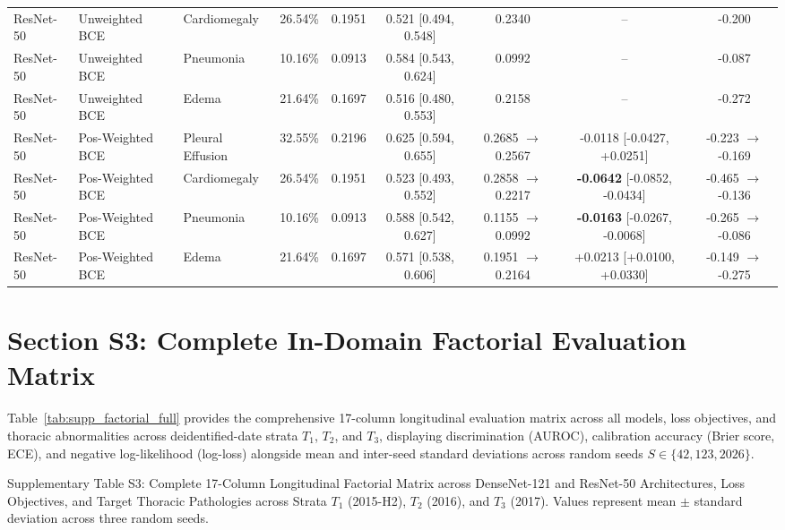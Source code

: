 \documentclass[preprint,12pt]{elsarticle}
\begin{document}
\begin{table}[!htbp]
{\begin{tabular}{lllcccccc}
ResNet-50 & Unweighted BCE & Cardiomegaly & 26.54\% & 0.1951 & 0.521 [0.494, 0.548] & 0.2340 & -- & -0.200 \\
ResNet-50 & Unweighted BCE & Pneumonia & 10.16\% & 0.0913 & 0.584 [0.543, 0.624] & 0.0992 & -- & -0.087 \\
ResNet-50 & Unweighted BCE & Edema & 21.64\% & 0.1697 & 0.516 [0.480, 0.553] & 0.2158 & -- & -0.272 \\
\midrule
ResNet-50 & Pos-Weighted BCE & Pleural Effusion & 32.55\% & 0.2196 & 0.625 [0.594, 0.655] & 0.2685 $\to$ 0.2567 & -0.0118 [-0.0427, +0.0251] & -0.223 $\to$ -0.169 \\
ResNet-50 & Pos-Weighted BCE & Cardiomegaly & 26.54\% & 0.1951 & 0.523 [0.493, 0.552] & 0.2858 $\to$ 0.2217 & \textbf{-0.0642} [-0.0852, -0.0434] & -0.465 $\to$ -0.136 \\
ResNet-50 & Pos-Weighted BCE & Pneumonia & 10.16\% & 0.0913 & 0.588 [0.542, 0.627] & 0.1155 $\to$ 0.0992 & \textbf{-0.0163} [-0.0267, -0.0068] & -0.265 $\to$ -0.086 \\
ResNet-50 & Pos-Weighted BCE & Edema & 21.64\% & 0.1697 & 0.571 [0.538, 0.606] & 0.1951 $\to$ 0.2164 & +0.0213 [+0.0100, +0.0330] & -0.149 $\to$ -0.275 \\
\bottomrule
\end{tabular}%
}
\end{table}

\section*{Section S3: Complete In-Domain Factorial Evaluation Matrix}
Table~\ref{tab:supp_factorial_full} provides the comprehensive 17-column longitudinal evaluation matrix across all models, loss objectives, and thoracic abnormalities across deidentified-date strata $T_1$, $T_2$, and $T_3$, displaying discrimination (AUROC), calibration accuracy (Brier score, ECE), and negative log-likelihood (log-loss) alongside mean and inter-seed standard deviations across random seeds $S \in \{42, 123, 2026\}$.

\begin{table}[!htbp]
\caption{Supplementary Table S3: Complete 17-Column Longitudinal Factorial Matrix across DenseNet-121 and ResNet-50 Architectures, Loss Objectives, and Target Thoracic Pathologies across Strata $T_1$ (2015-H2), $T_2$ (2016), and $T_3$ (2017). Values represent mean $\pm$ standard deviation across three random seeds.}
\label{tab:supp_factorial_full}
\centering
\resizebox{\textwidth}{!}{%

}
\end{table}
\end{document}

